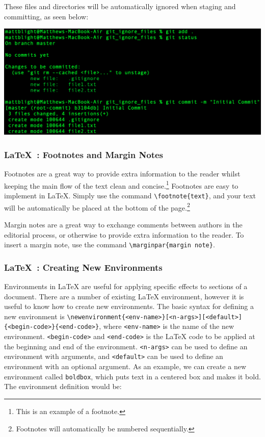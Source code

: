 \documentclass[a4paper, 11pt]{report}
\begin{document}
These files and directories will be automatically ignored when staging and committing, as seen below:

\includegraphics[width=\textwidth]{ignore3}


\newpage


\subsubsection{\LaTeX\ : Footnotes and Margin Notes \cite{footnotes}}

Footnotes are a great way to provide extra information to the reader whilst keeping the main flow of the text clean and concise.\footnote{This is an example of a footnote.} Footnotes are easy to implement in LaTeX. Simply use the command \verb|\footnote{text}|, and your text will be automatically be placed at the bottom of the page.\footnote{Footnotes will automatically be numbered sequentially.}

Margin notes are a great way to exchange comments between authors in the editorial process, or otherwise to provide extra information to the reader. To insert a margin note, use the command \verb|\marginpar{margin note}|. 

\subsubsection{\LaTeX\ : Creating New Environments}

Environments in LaTeX are useful for applying specific effects to sections of a document. There are a number of existing LaTeX environment, however it is useful to know how to create new environments. The basic syntax for defining a new environment is \verb|\newenvironment{<env-name>}[<n-args>][<default>]{<begin-code>}{<end-code>}|, where \verb|<env-name>| is the name of the new environment. \verb|<begin-code>| and \verb|<end-code>| is the LaTeX code to be applied at the beginning and end of the environment. \verb|<n-args>| can be used to define an environment with arguments, and \verb|<default>| can be used to define an environment with an optional argument. As an example, we can create a new environment called \verb|boldbox|, which puts text in a centered box and makes it bold. The environment definition would be:
\end{document}
